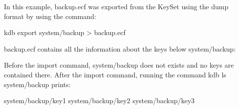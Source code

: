 In this example, backup.\+ecf was exported from the Key\+Set using the dump format by using the command\+: \begin{DoxyVerb}    kdb export system/backup > backup.ecf
\end{DoxyVerb}


backup.\+ecf contains all the information about the keys below system/backup\+: 


Before the import command, system/backup does not exists and no keys are contained there. After the import command, running the command {\ttfamily kdb ls system/backup} prints\+: \begin{DoxyVerb}    system/backup/key1
    system/backup/key2
    system/backup/key3\end{DoxyVerb}
 